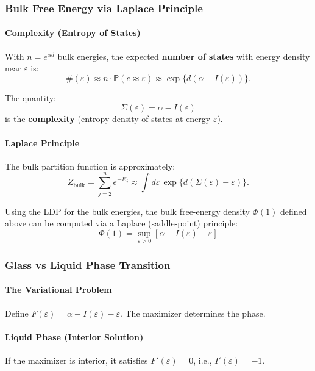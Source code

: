 \documentclass[11pt]{article}
\begin{document}
\subsubsection{Bulk Free Energy via Laplace Principle}
\paragraph{Complexity (Entropy of States)}
With $n = e^{\alpha d}$ bulk energies, the expected \textbf{number of states} with energy density near $\varepsilon$ is:
\begin{equation}
\#(\varepsilon) \approx n \cdot \mathbb{P}(e \approx \varepsilon) \approx \exp\{d(\alpha - I(\varepsilon))\}.
\end{equation}

The quantity:
\begin{equation}
\Sigma(\varepsilon) = \alpha - I(\varepsilon)
\end{equation}
is the \textbf{complexity} (entropy density of states at energy $\varepsilon$).

\paragraph{Laplace Principle}
The bulk partition function is approximately:
\begin{equation}
Z_{\text{bulk}} = \sum_{j=2}^n e^{-E_j} \approx \int d\varepsilon \, \exp\{d(\Sigma(\varepsilon) - \varepsilon)\}.
\end{equation}

Using the LDP for the bulk energies, the bulk free-energy density $\Phi(1)$ defined above can be computed via a Laplace (saddle-point) principle:
\begin{equation}
\boxed{
\Phi(1) = \sup_{\varepsilon > 0}\left[\alpha - I(\varepsilon) - \varepsilon\right]
}
\end{equation}

\subsubsection{Glass vs Liquid Phase Transition}
\paragraph{The Variational Problem}
Define $F(\varepsilon) = \alpha - I(\varepsilon) - \varepsilon$. The maximizer determines the phase.

\paragraph{Liquid Phase (Interior Solution)}
If the maximizer is interior, it satisfies $F'(\varepsilon) = 0$, i.e., $I'(\varepsilon) = -1$.
\end{document}
